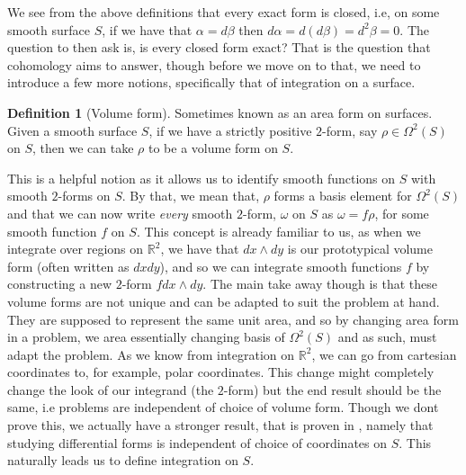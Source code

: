 \documentclass[11pt]{report}
\theoremstyle{definition}
\newtheorem{defn}[thm]{Definition}
\begin{document}
We see from the above definitions that every exact form is closed, i.e, on some smooth surface $S$, if we have that $\alpha = d\beta $ then $d\alpha = d(d\beta) = d^2\beta = 0$. The question to then ask is, is every closed form exact? That is the question that cohomology aims to answer, though before we move on to that, we need to introduce a few more notions, specifically that of integration on a surface.
\begin{defn}[Volume form]\label{volumeform}
  Sometimes known as an area form on surfaces. Given a smooth surface $S$, if we have a strictly positive $2$-form, say $\rho \in \Omega^2(S)$ on $S$, then we can take $\rho$ to be a volume form on $S$. 
\end{defn}
This is a helpful notion as it allows us to identify smooth functions on $S$ with smooth $2$-forms on $S$. By that, we mean that, $\rho$ forms a basis element for $\Omega^2(S)$ and that we can now write \emph{every} smooth $2$-form, $\omega$ on $S$ as $\omega = f\rho$, for some smooth function $f$ on $S$. This concept is already familiar to us, as when we integrate over regions on $\mathbb{R}^2$, we have that $dx\wedge dy$ is our prototypical volume form (often written as $dxdy$), and so we can integrate smooth functions $f$ by constructing a new $2$-form $fdx\wedge dy$. The main take away though is that these volume forms are not unique and can be adapted to suit the problem at hand. They are supposed to represent the same unit area, and so by changing area form in a problem, we area essentially changing basis of $\Omega^2(S)$ and as such, must adapt the problem. As we know from integration on $\mathbb{R}^2$, we can go from cartesian coordinates to, for example, polar coordinates. This change might completely change the look of our integrand (the $2$-form) but the end result should be the same, i.e problems are independent of choice of volume form. Though we dont prove this, we actually have a stronger result, that is proven in \cite{calcohomo}, namely that studying differential forms is independent of choice of coordinates on $S$.
This naturally leads us to define integration on $S$.
\end{document}
